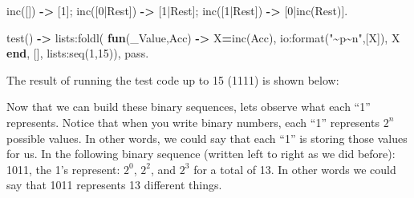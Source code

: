 \documentclass[
]{book}
\newenvironment{Shaded}{\begin{snugshade}}{\end{snugshade}}
\newcommand{\CharTok}[1]{\textcolor[rgb]{0.31,0.60,0.02}{#1}}
\newcommand{\DecValTok}[1]{\textcolor[rgb]{0.00,0.00,0.81}{#1}}
\newcommand{\FunctionTok}[1]{\textcolor[rgb]{0.00,0.00,0.00}{#1}}
\newcommand{\KeywordTok}[1]{\textcolor[rgb]{0.13,0.29,0.53}{\textbf{#1}}}
\newcommand{\NormalTok}[1]{#1}
\newcommand{\OperatorTok}[1]{\textcolor[rgb]{0.81,0.36,0.00}{\textbf{#1}}}
\newcommand{\StringTok}[1]{\textcolor[rgb]{0.31,0.60,0.02}{#1}}
\newcommand{\VariableTok}[1]{\textcolor[rgb]{0.00,0.00,0.00}{#1}}
\begin{document}
\begin{Shaded}
\begin{Highlighting}[]
\FunctionTok{inc([])} \OperatorTok{{-}\textgreater{}} \FunctionTok{[}\DecValTok{1}\FunctionTok{];}
\FunctionTok{inc([}\DecValTok{0}\FunctionTok{|}\VariableTok{Rest}\FunctionTok{])} \OperatorTok{{-}\textgreater{}} \FunctionTok{[}\DecValTok{1}\FunctionTok{|}\VariableTok{Rest}\FunctionTok{];}
\FunctionTok{inc([}\DecValTok{1}\FunctionTok{|}\VariableTok{Rest}\FunctionTok{])} \OperatorTok{{-}\textgreater{}} \FunctionTok{[}\DecValTok{0}\FunctionTok{|inc(}\VariableTok{Rest}\FunctionTok{)].}

\FunctionTok{test()} \OperatorTok{{-}\textgreater{}}
    \FunctionTok{lists:foldl(}
        \KeywordTok{fun}\FunctionTok{(}\VariableTok{\_Value}\FunctionTok{,}\VariableTok{Acc}\FunctionTok{)} \OperatorTok{{-}\textgreater{}} 
            \VariableTok{X}\OperatorTok{=}\FunctionTok{inc(}\VariableTok{Acc}\FunctionTok{),} 
            \FunctionTok{io:format(}\StringTok{"\textasciitilde{}p\textasciitilde{}n"}\FunctionTok{,[}\VariableTok{X}\FunctionTok{]),} 
            \VariableTok{X} 
        \KeywordTok{end}\FunctionTok{,} \FunctionTok{[],} \FunctionTok{lists:seq(}\DecValTok{1}\FunctionTok{,}\DecValTok{15}\FunctionTok{)),}
    \CharTok{pass}\FunctionTok{.}
\end{Highlighting}
\end{Shaded}

The result of running the test code up to 15 (1111) is shown below:

\begin{Shaded}
\begin{Highlighting}[]
\NormalTok{[1]}
\NormalTok{[0,1]}
\NormalTok{[1,1]}
\NormalTok{[0,0,1]}
\NormalTok{[1,0,1]}
\NormalTok{[0,1,1]}
\NormalTok{[1,1,1]}
\NormalTok{[0,0,0,1]}
\NormalTok{[1,0,0,1]}
\NormalTok{[0,1,0,1]}
\NormalTok{[1,1,0,1]}
\NormalTok{[0,0,1,1]}
\NormalTok{[1,0,1,1]}
\NormalTok{[0,1,1,1]}
\NormalTok{[1,1,1,1]}
\end{Highlighting}
\end{Shaded}

Now that we can build these binary sequences, lets observe what each ``1'' represents. Notice that when you write binary numbers, each ``1'' represents \(2^n\) possible values. In other words, we could say that each ``1'' is storing those values for us. In the following binary sequence (written left to right as we did before): 1011, the 1's represent: \(2^0\), \(2^2\), and \(2^3\) for a total of 13. In other words we could say that 1011 represents 13 different things.
\end{document}
